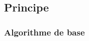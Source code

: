 \documentclass{beamer}%
\begin{document}
		\subsection{Principe}
			\begin{frame}
				\frametitle{Algorithme de base}		
				\begin{columns}
					\column{2in}
						\begin{figure}
							\centering
							\\
						\end{figure}

\end{columns}
\end{frame}
\end{document}
